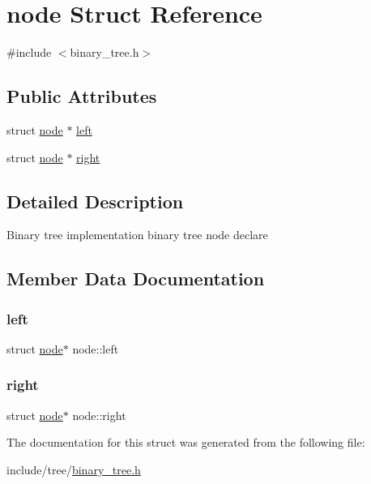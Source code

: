 \hypertarget{structnode}{}\section{node Struct Reference}
\label{structnode}


{\ttfamily \#include $<$binary\+\_\+tree.\+h$>$}

\subsection*{Public Attributes}
\begin{DoxyCompactItemize}
\item 
struct \mbox{\hyperlink{structnode}{node}} $\ast$ \mbox{\hyperlink{structnode_a3ce38490a651bfda86d88ff955e96abc}{left}}
\item 
struct \mbox{\hyperlink{structnode}{node}} $\ast$ \mbox{\hyperlink{structnode_a875f75abfe22103500535b179828e4e3}{right}}
\end{DoxyCompactItemize}


\subsection{Detailed Description}
Binary tree implementation binary tree node declare 

\subsection{Member Data Documentation}
\mbox{\label{structnode_a3ce38490a651bfda86d88ff955e96abc}} 
\subsubsection{\texorpdfstring{left}{left}}
{\footnotesize\ttfamily struct \mbox{\hyperlink{structnode}{node}}$\ast$ node\+::left}

\mbox{\label{structnode_a875f75abfe22103500535b179828e4e3}} 
\subsubsection{\texorpdfstring{right}{right}}
{\footnotesize\ttfamily struct \mbox{\hyperlink{structnode}{node}}$\ast$ node\+::right}



The documentation for this struct was generated from the following file\+:\begin{DoxyCompactItemize}
\item 
include/tree/\mbox{\hyperlink{binary__tree_8h}{binary\+\_\+tree.\+h}}\end{DoxyCompactItemize}
